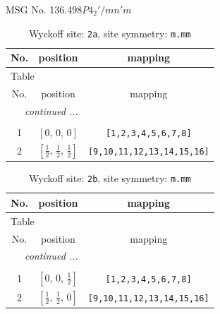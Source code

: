 \documentclass[fleqn,8pt]{jsarticle}
\begin{document}
\setcounter{MaxMatrixCols}{32}

\renewcommand{\tablename}{Table~}
\renewcommand{\figurename}{Figure~}
\begin{center}
\LARGE
MSG No. 136.498\quad$P4_{2}'/mn'm$
\end{center}
\renewcommand{\arraystretch}{1.2}
\begin{longtable}{ccc}
\caption{Wyckoff site: {\tt 2a}, site symmetry: {\tt m.mm}}
 \\
 \hline \hline
No. & position & mapping \\ \hline \endfirsthead

\multicolumn{2}{l}{\tablename\ \thetable{}} \\
 \hline \hline
No. & position & mapping \\ \hline \endhead

 \hline \hline
\multicolumn{2}{r}{\footnotesize\it continued ...} \\ \endfoot

 \hline \hline
\multicolumn{2}{r}{} \\ \endlastfoot

1 & $\left[ 0,\, 0,\, 0 \right]$ & {\tt [1,2,3,4,5,6,7,8]} \\ \hline
2 & $\left[ \frac{1}{2},\, \frac{1}{2},\, \frac{1}{2} \right]$ & {\tt [9,10,11,12,13,14,15,16]} \\
\end{longtable}
\renewcommand{\arraystretch}{1.2}
\begin{longtable}{ccc}
\caption{Wyckoff site: {\tt 2b}, site symmetry: {\tt m.mm}}
 \\
 \hline \hline
No. & position & mapping \\ \hline \endfirsthead

\multicolumn{2}{l}{\tablename\ \thetable{}} \\
 \hline \hline
No. & position & mapping \\ \hline \endhead

 \hline \hline
\multicolumn{2}{r}{\footnotesize\it continued ...} \\ \endfoot

 \hline \hline
\multicolumn{2}{r}{} \\ \endlastfoot

1 & $\left[ 0,\, 0,\, \frac{1}{2} \right]$ & {\tt [1,2,3,4,5,6,7,8]} \\ \hline
2 & $\left[ \frac{1}{2},\, \frac{1}{2},\, 0 \right]$ & {\tt [9,10,11,12,13,14,15,16]} \\
\end{longtable}
\end{document}
